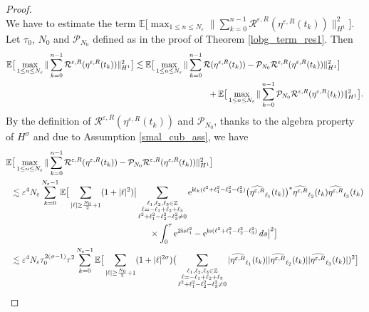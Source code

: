 \documentclass[a4paper]{amsart}
\begin{document}
\begin{proof}
\begin{equation*}
\end{equation*}
We have to estimate the term $\mathbb{E}\big[\displaystyle\max_{1\le n \le N_\varepsilon}\|\sum_{k=0}^{n-1}\mathcal{R}^{\varepsilon,R}(\eta^{\varepsilon,R}(t_k))\|^{2}_{H^1}\big]$. Let $\tau_0$, $N_0$ and $\mathcal{P}_{N_0}$ defined as in the proof of Theorem \ref{lobg_term_res1}. Then
\begin{align*}
\mathbb{E}\big[\max_{1\le n\le N_\varepsilon}\|\sum_{k=0}^{n-1}\mathcal{R}^{\varepsilon,R}(\eta^{\varepsilon,R}(t_k))\|^{2}_{H^1}\big]&\lesssim \mathbb{E}\big[\max_{1\le n\le N_\varepsilon}\|\sum_{k=0}^{n-1}\mathcal{R}(\eta^{\varepsilon,R}(t_k))-\mathcal{P}_{N_0}\mathcal{R}^{\varepsilon,R}(\eta^{\varepsilon,R}(t_k))\|^{2}_{H^1}\big]\\
&\hspace{3.1cm}+\mathbb{E}\big[\max_{1\le n\le N_\varepsilon}\|\sum_{k=0}^{n-1}\mathcal{P}_{N_0}\mathcal{R}^{\varepsilon,R}(\eta^{\varepsilon,R}(t_k))\|^{2}_{H^1}\big].
\end{align*}
By the definition of $\mathcal{R}^{\varepsilon,R}(\eta^{\varepsilon,R}(t_k))$ and $\mathcal{P}_{N_0}$, thanks to the algebra property of $H^\sigma$ and due to Assumption \ref{smal_cub_ass}, we have
\begin{align*}
    &\mathbb{E}\big[\max_{1\le n\le N_\varepsilon}\|\sum_{k=0}^{n-1}\mathcal{R}^{\varepsilon,R}(\eta^{\varepsilon,R}(t_k))-\mathcal{P}_{N_0}\mathcal{R}^{\varepsilon,R}(\eta^{\varepsilon,R}(t_k))\|^{2}_{H^1}\big]\\
    &\hspace{0.2cm}\lesssim \varepsilon^{4}N_\varepsilon\sum_{k=0}^{N_\varepsilon-1}\mathbb{E}\big[\displaystyle\sum_{|\ell|\ge \frac{N_0}{2}+1}(1+|\ell|^2)\big|\displaystyle\sum_{\substack{\ell_1,\ell_2,\ell_3 \in\mathbb{Z} \\ \ell=-\ell_1+\ell_2+\ell_3\\ \ell^2+\ell_1^2-\ell_2^2-\ell_3^2\ne 0}}{\rm e}^{{\bf i}t_k (\ell^2+\ell_1^2-\ell_2^2-\ell_3^2)}\big(\widehat{\eta^{\varepsilon,R}}_{\ell_1}(t_k)\big)^*\widehat{\eta^{\varepsilon,R}}_{\ell_2}(t_k)\widehat{\eta^{\varepsilon,R}}_{\ell_3}(t_k)\\
        &\hspace{6cm}\times \int_0^\tau  {\rm e}^{2{\bf i}s \ell_1^2}-{\rm e}^{{\bf i}s (\ell^2+\ell_1^2-\ell_2^2-\ell_3^2)}\,ds\big|^2\big]\\
        &\hspace{0.2cm}\lesssim \varepsilon^{4}N_\varepsilon \tau_0^{2(\sigma-1)}\tau^{2}\sum_{k=0}^{N_\varepsilon-1}\mathbb{E}\big[\displaystyle\sum_{|\ell|\ge \frac{N_0}{2}+1}(1+|\ell|^{2\sigma})\big(\displaystyle\sum_{\substack{\ell_1,\ell_2,\ell_3 \in\mathbb{Z} \\ \ell=-\ell_1+\ell_2+\ell_3\\ \ell^2+\ell_1^2-\ell_2^2-\ell_3^2\ne 0}}|\widehat{\eta^{\varepsilon,R}}_{\ell_1}(t_k)| |\widehat{\eta^{\varepsilon,R}}_{\ell_2}(t_k)| |\widehat{\eta^{\varepsilon,R}}_{\ell_3}(t_k)|)^2\big]\\

\end{align*}
\end{proof}
\end{document}
